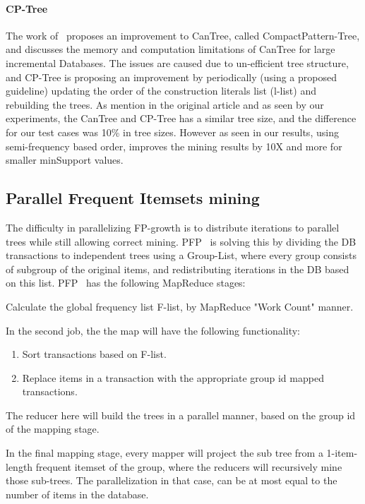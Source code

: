 \paragraph{CP-Tree}
\label{par:cptree}
	The work of~\cite{tanbeer2009efficient} proposes an improvement to CanTree, called CompactPattern-Tree, and discusses the memory and computation limitations of CanTree for large incremental Databases. The issues are caused due to un-efficient tree structure, and CP-Tree is proposing an improvement by periodically (using a proposed guideline) updating the order of the construction literals list (l-list) and rebuilding the trees. As mention in the original article and as seen by our experiments, the CanTree and CP-Tree has a similar tree size, and the difference for our test cases was 10\% in tree sizes. However as seen in our results, using semi-frequency based order, improves the mining results by 10X and more for smaller minSupport values.


\subsection{Parallel Frequent Itemsets mining}
The difficulty in parallelizing FP-growth is to distribute iterations to parallel trees while still allowing correct mining. PFP~\cite{li2008pfp} is solving this by dividing the DB transactions to independent trees using a Group-List, where every group consists of subgroup of the original items, and redistributing iterations in the DB based on this list.
PFP~\cite{li2008pfp} has the following MapReduce stages:

\begin{steps}
\item Calculate the global frequency list F-list, by MapReduce "Work Count" manner.
\item In the second job, the the map will have the following functionality:
\begin{enumerate}
\item Sort transactions based on F-list.
\item Replace items in a transaction with the appropriate group id mapped transactions.
\end{enumerate}
	The reducer here will build the trees in a parallel manner, based on the group id of the mapping stage.
\item In the final mapping stage, every mapper will project the sub tree from a 1-item-length frequent itemset of the group, where the reducers will recursively mine those sub-trees. The parallelization in that case, can be at most equal to the number of items in the database.
\end{steps}

